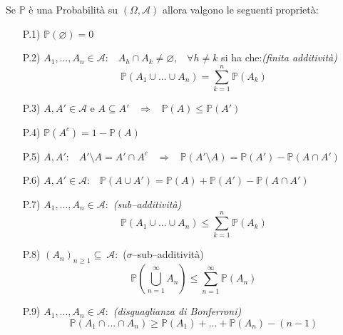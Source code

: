 \begin{teorema}
    Se $\mathbb{P}$ è una Probabilità su $(\Omega, \mathcal{A})$ allora valgono le seguenti proprietà:
    \begin{enumerate}
        \item [P.1)] $\mathbb{P}(\varnothing)=0$
        \item [P.2)] $A_1, ...,A_n \in \mathcal{A}:\;\;\; A_h\cap A_k \neq\varnothing, \;\;\; \forall h\neq k$ si ha che:\hfill \textit{(finita additività)}
        \[\mathbb{P}(A_1\cup ...\cup A_n)= \sum_{k=1}^{n}\mathbb{P}(A_k)\] 
        \item [P.3)] $A, A' \in \mathcal{A}$ e $A \subseteq A'\;\;\; \Rightarrow \;\;\; \mathbb{P}(A) \leq \mathbb{P}(A')$ 
        \item [P.4)] $\mathbb{P}(A^c) = 1- \mathbb{P}(A)$
        \item [P.5)] $A, A': \;\;\; A'\setminus A = A' \cap A^c \;\;\; \Rightarrow \;\;\; \mathbb{P}(A'\setminus A) = \mathbb{P}(A') - \mathbb{P}(A \cap A')$
        \item [P.6)] $A, A'\in \mathcal{A}: \;\;\; \mathbb{P}(A\cup A') = \mathbb{P}(A)+\mathbb{P}(A')-\mathbb{P}(A\cap A')$
        \item [P.7)] $A_1, ...,A_n \in \mathcal{A}:$ \hfill \textit{(sub--additività)}\[\mathbb{P}(A_1\cup ...\cup A_n)\leq \sum_{k=1}^{n}\mathbb{P}(A_k)\]
        \item [P.8)] $(A_n)_{n\geq 1} \subseteq\ \mathcal{A}:$ \hfill ($\sigma$--sub--additività)
        \[\mathbb{P}(\bigcup_{n=1}^{\infty}A_n)\leq \sum_{n=1}^{\infty}\mathbb{P}(A_n)\]
        \item [P.9)] $A_1, ...,A_n \in \mathcal{A}:$ \hfill \textit{(disguaglianza di Bonferroni)}
        \[\mathbb{P}(A_1 \cap ... \cap A_n) \geq \mathbb{P}(A_1)+...+ \mathbb{P}(A_n)-(n-1)\]
    \end{enumerate}
\end{teorema}
\noindent
